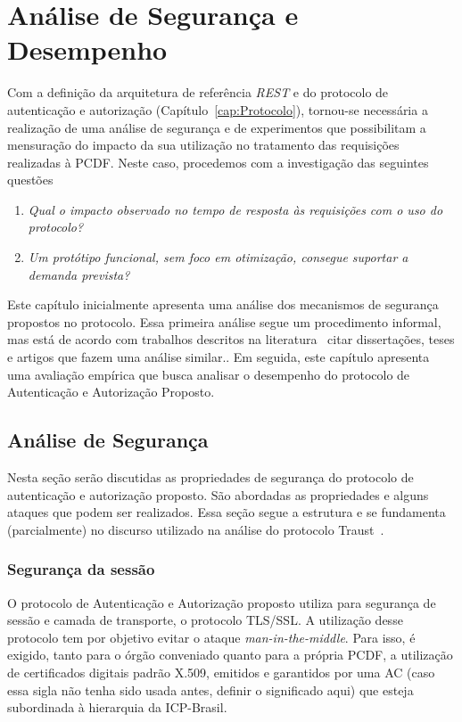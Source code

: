 \chapter{Análise de Segurança e Desempenho}

Com a definição da arquitetura de referência \emph{REST}  e do protocolo de autenticação e autorização (Capítulo~\ref{cap:Protocolo}),
tornou-se necess\'{a}ria a realiza\c c\~{a}o de uma an\'{a}lise de seguran\c ca e de experimentos que possibilitam a mensuração do
impacto da sua utilização no tratamento das requisi\c c\~{o}es realizadas \`{a} PCDF. Neste caso, procedemos com
a investiga\c c\~{a}o das seguintes quest\~{o}es

\parbox{0.8\textwidth}{
\begin{enumerate}[(Q1)]
\item \emph{Qual o impacto observado no tempo de resposta às requisi\c c\~{o}es com o uso do protocolo?}
\item \emph{Um prot\'{o}tipo funcional, sem foco em otimiza\c c\~{a}o, consegue suportar a demanda prevista?}
\end{enumerate}}


Este capítulo inicialmente apresenta uma análise dos mecanismos de segurança propostos no protocolo. Essa primeira
análise segue um procedimento informal, mas está de acordo com trabalhos descritos na literatura~\cite{} {\color{red}citar
disserta\c c\~{o}es, teses e artigos que fazem uma an\'{a}lise similar.}. Em seguida, este capítulo apresenta uma avaliação empírica que busca analisar o desempenho do protocolo de Autenticação e Autorização Proposto.
\section{Análise de Segurança}

Nesta seção serão discutidas as propriedades de segurança do protocolo de autenticação e autorização proposto. São abordadas as propriedades e alguns ataques que podem ser realizados. Essa seção segue a estrutura e se fundamenta (parcialmente) no discurso utilizado na an\'{a}lise do protocolo Traust~\cite{traust08}.

\subsection{Segurança da sessão}

O protocolo de Autenticação e Autorização proposto utiliza para segurança de sessão e camada de transporte, o protocolo
TLS/SSL. A utilização desse protocolo tem por objetivo evitar o ataque \emph{man-in-the-middle}. Para isso, é exigido, tanto para o órgão conveniado quanto para a própria
PCDF, a utiliza\c c\~{a}o de certificados digitais padrão X.509, emitidos e garantidos por uma {\color{red}AC (caso essa sigla n\~{a}o tenha sido usada antes,
definir o significado aqui)} que esteja subordinada à hierarquia da ICP-Brasil.

